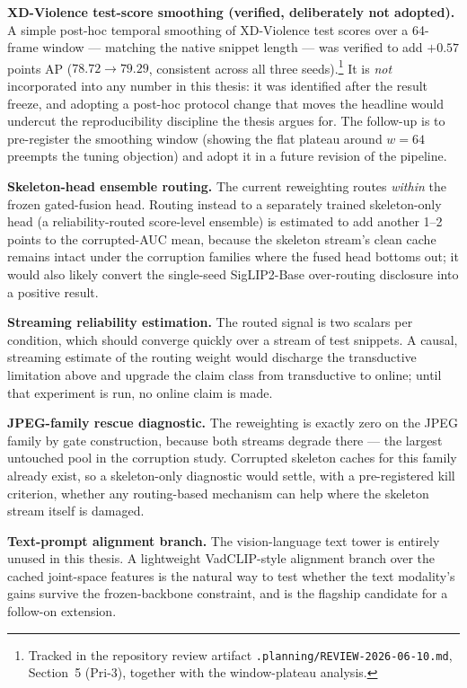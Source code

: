 \textbf{XD-Violence test-score smoothing (verified, deliberately not
adopted).} A simple post-hoc temporal smoothing of XD-Violence test scores
over a 64-frame window --- matching the native snippet length --- was verified
to add $+0.57$ points AP ($78.72 \to 79.29$, consistent across all three
seeds).\footnote{Tracked in the repository review artifact
\texttt{.planning/REVIEW-2026-06-10.md}, Section~5 (Pri-3), together with the
window-plateau analysis.} It is \emph{not} incorporated into any number in
this thesis: it was identified after the result freeze, and adopting a
post-hoc protocol change that moves the headline would undercut the
reproducibility discipline the thesis argues for. The follow-up is to
pre-register the smoothing window (showing the flat plateau around $w=64$
preempts the tuning objection) and adopt it in a future revision of the
pipeline.

\textbf{Skeleton-head ensemble routing.} The current reweighting routes
\emph{within} the frozen gated-fusion head. Routing instead to a separately
trained skeleton-only head (a reliability-routed score-level ensemble) is
estimated to add another 1--2 points to the corrupted-AUC mean, because the
skeleton stream's clean cache remains intact under the corruption families
where the fused head bottoms out; it would also likely convert the single-seed
SigLIP2-Base over-routing disclosure into a positive result.

\textbf{Streaming reliability estimation.} The routed signal is two scalars
per condition, which should converge quickly over a stream of test snippets. A
causal, streaming estimate of the routing weight would discharge the
transductive limitation above and upgrade the claim class from transductive to
online; until that experiment is run, no online claim is made.

\textbf{JPEG-family rescue diagnostic.} The reweighting is exactly zero on the
JPEG family by gate construction, because both streams degrade there --- the
largest untouched pool in the corruption study. Corrupted skeleton caches for
this family already exist, so a skeleton-only diagnostic would settle, with a
pre-registered kill criterion, whether any routing-based mechanism can help
where the skeleton stream itself is damaged.

\textbf{Text-prompt alignment branch.} The vision-language text tower is
entirely unused in this thesis. A lightweight VadCLIP-style alignment branch
over the cached joint-space features is the natural way to test whether the
text modality's gains survive the frozen-backbone constraint, and is the
flagship candidate for a follow-on extension.

